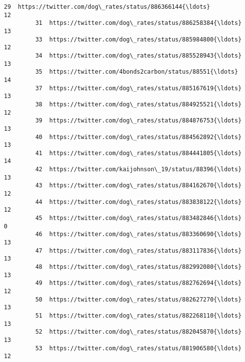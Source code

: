 \documentclass[11pt]{article}
\begin{document}
\begin{Verbatim}[commandchars=\\\{\}]
         29  https://twitter.com/dog\_rates/status/886366144{\ldots}                12   
         31  https://twitter.com/dog\_rates/status/886258384{\ldots}                13   
         33  https://twitter.com/dog\_rates/status/885984800{\ldots}                12   
         34  https://twitter.com/dog\_rates/status/885528943{\ldots}                13   
         35  https://twitter.com/4bonds2carbon/status/88551{\ldots}                14   
         37  https://twitter.com/dog\_rates/status/885167619{\ldots}                13   
         38  https://twitter.com/dog\_rates/status/884925521{\ldots}                12   
         39  https://twitter.com/dog\_rates/status/884876753{\ldots}                13   
         40  https://twitter.com/dog\_rates/status/884562892{\ldots}                13   
         41  https://twitter.com/dog\_rates/status/884441805{\ldots}                14   
         42  https://twitter.com/kaijohnson\_19/status/88396{\ldots}                13   
         43  https://twitter.com/dog\_rates/status/884162670{\ldots}                12   
         44  https://twitter.com/dog\_rates/status/883838122{\ldots}                12   
         45  https://twitter.com/dog\_rates/status/883482846{\ldots}                 0   
         46  https://twitter.com/dog\_rates/status/883360690{\ldots}                13   
         47  https://twitter.com/dog\_rates/status/883117836{\ldots}                13   
         48  https://twitter.com/dog\_rates/status/882992080{\ldots}                13   
         49  https://twitter.com/dog\_rates/status/882762694{\ldots}                12   
         50  https://twitter.com/dog\_rates/status/882627270{\ldots}                13   
         51  https://twitter.com/dog\_rates/status/882268110{\ldots}                13   
         52  https://twitter.com/dog\_rates/status/882045870{\ldots}                13   
         53  https://twitter.com/dog\_rates/status/881906580{\ldots}                12   
         

\end{Verbatim}
\end{document}
